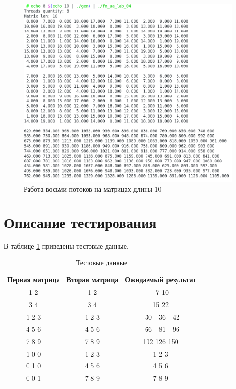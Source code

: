 \begin{figure}[H]
    \centering
    \includegraphics[scale=0.6]{./images/example5.png}
    \caption{Работа восьми потоков на матрицах длины 10}
    \label{img:ex5}
\end{figure}

\section{Описание тестирования}

В таблице \ref{table:test} приведены тестовые данные.

\begin{table}[H]
    \caption{Тестовые данные}
    \label{table:test}
    \centering
    \begin{tabular}{|c|c|c|}
        \hline
        Первая матрица & Вторая матрица & Ожидаемый результат \\
        \hline
        1 2 & 1 2 & \ 7 10 \\
        3 4 & 3 4 & 15 22 \\
        \hline
        1 2 3 & 1 2 3 & \ 30\ \ 36\ \ 42 \\
        4 5 6 & 4 5 6 & \ 66\ \ 81\ \ 96 \\
        7 8 9 & 7 8 9 & 102 126 150 \\
        \hline
        1 0 0 & 1 2 3 & 1 2 3 \\
        0 1 0 & 4 5 6 & 4 5 6 \\
        0 0 1 & 7 8 9 & 7 8 9 \\
        \hline
    \end{tabular}
\end{table}

